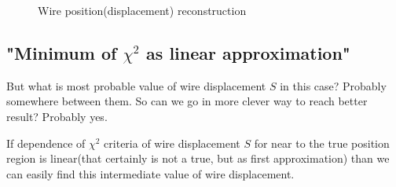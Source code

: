 \documentclass[]{article}
\begin{document}
	\begin{figure}[h!]
		\centering
		\qquad
		\caption{Wire position(displacement) reconstruction}			
	\end{figure}	
	
	

	\subsection{"Minimum of $\chi^2$ as linear approximation"}
	But what is most probable value of wire displacement $S$ in this case? Probably somewhere between them. So can we go in more clever way to reach better result? Probably yes.
	
	If dependence of $\chi^2$ criteria of wire displacement $S$ for near to the true position region is linear(that certainly is not a true, but as first approximation) than we can easily find this intermediate value of wire displacement.
	
\end{document}
